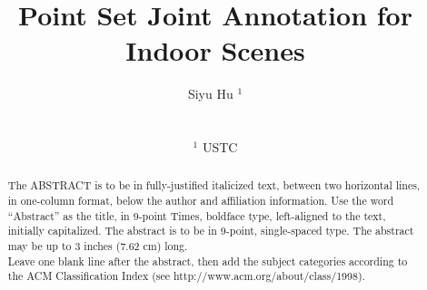

\title[EG \LaTeX\ Author Guidelines]%
      {Point Set Joint Annotation for Indoor Scenes}

\author[Siyu Hu]
{\parbox{\textwidth}{\centering Siyu Hu $^1$}
        \\
{\parbox{\textwidth}{\centering $^1$ USTC\\
       } 
}
}

%





\maketitle

\begin{abstract}
   The ABSTRACT is to be in fully-justified italicized text, 
   between two horizontal lines,
   in one-column format, 
   below the author and affiliation information. 
   Use the word ``Abstract'' as the title, in 9-point Times, boldface type, 
   left-aligned to the text, initially capitalized. 
   The abstract is to be in 9-point, single-spaced type.
   The abstract may be up to 3 inches (7.62 cm) long. \\
   Leave one blank line after the abstract, 
   then add the subject categories according to the ACM Classification Index 
   (see http://www.acm.org/about/class/1998).

\begin{classification} %
\end{classification}

\end{abstract}

